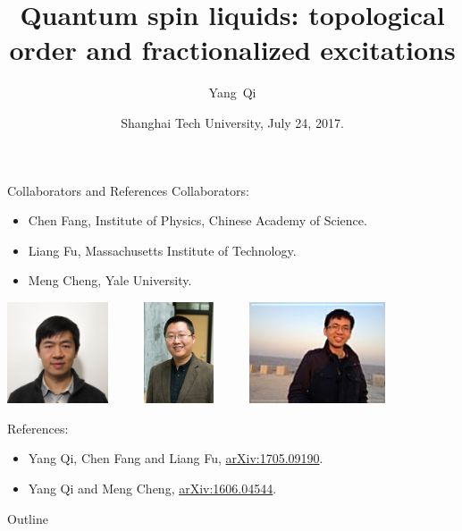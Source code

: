 \documentclass[xcolor=table, 10pt, aspectratio=169]{beamer}
\title[Mirror SET] %
{Quantum spin liquids: topological order and fractionalized excitations}
\author[Y Qi] %
{Yang~Qi}
\institute[MIT] %
{
  Massachusetts Institute of Technology\\
  Joining Fudan University in 2017
}
\date{Shanghai Tech University, July 24, 2017.}
\begin{document}
\begin{frame}
  \titlepage
\end{frame}

\begin{frame}{Collaborators and References}
  Collaborators:
  \begin{itemize}
		\item Chen Fang, Institute of Physics, Chinese Academy of Science.
		\item Liang Fu, Massachusetts Institute of Technology.
    \item Meng Cheng, Yale University.
  \end{itemize}
  \begin{center}
    \includegraphics[height=3cm]{../people/chenfang}~~~~~
	  \includegraphics[height=3cm]{../people/liangfu}~~~~~
    \includegraphics[height=3cm]{../people/mengcheng}
  \end{center}
  References:
  {\small
  \begin{itemize}
  \item Yang Qi, Chen Fang and Liang Fu, \href{https://arxiv.org/abs/1705.09190}{arXiv:1705.09190}.
  \item Yang Qi and Meng Cheng,
  \href{https://arxiv.org/abs/1606.04544}{arXiv:1606.04544}.
  \end{itemize}}
\end{frame}

\begin{frame}{Outline}
		\tableofcontents
\end{frame}
\end{document}
